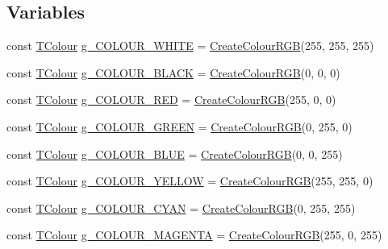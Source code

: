\subsection*{Variables}
\begin{DoxyCompactItemize}
\item 
const \hyperlink{struct_slim_1_1_t_colour}{T\+Colour} \hyperlink{namespace_slim_aabd7d1ab5686441d89da465b5d78e06c}{g\+\_\+\+C\+O\+L\+O\+U\+R\+\_\+\+W\+H\+I\+T\+E} = \hyperlink{namespace_slim_aa24ab919437d71782c999fbe3ae00684}{Create\+Colour\+R\+G\+B}(255, 255, 255)
\item 
const \hyperlink{struct_slim_1_1_t_colour}{T\+Colour} \hyperlink{namespace_slim_a8f55af55b9d6bd5d1a247ae77239e9ec}{g\+\_\+\+C\+O\+L\+O\+U\+R\+\_\+\+B\+L\+A\+C\+K} = \hyperlink{namespace_slim_aa24ab919437d71782c999fbe3ae00684}{Create\+Colour\+R\+G\+B}(0, 0, 0)
\item 
const \hyperlink{struct_slim_1_1_t_colour}{T\+Colour} \hyperlink{namespace_slim_a3ebe25e5235634ded92715ea38733109}{g\+\_\+\+C\+O\+L\+O\+U\+R\+\_\+\+R\+E\+D} = \hyperlink{namespace_slim_aa24ab919437d71782c999fbe3ae00684}{Create\+Colour\+R\+G\+B}(255, 0, 0)
\item 
const \hyperlink{struct_slim_1_1_t_colour}{T\+Colour} \hyperlink{namespace_slim_a9720f56180098de9f641858511f0a3f8}{g\+\_\+\+C\+O\+L\+O\+U\+R\+\_\+\+G\+R\+E\+E\+N} = \hyperlink{namespace_slim_aa24ab919437d71782c999fbe3ae00684}{Create\+Colour\+R\+G\+B}(0, 255, 0)
\item 
const \hyperlink{struct_slim_1_1_t_colour}{T\+Colour} \hyperlink{namespace_slim_a2ff65ee94b0f7dbb4cc7614b6d34b075}{g\+\_\+\+C\+O\+L\+O\+U\+R\+\_\+\+B\+L\+U\+E} = \hyperlink{namespace_slim_aa24ab919437d71782c999fbe3ae00684}{Create\+Colour\+R\+G\+B}(0, 0, 255)
\item 
const \hyperlink{struct_slim_1_1_t_colour}{T\+Colour} \hyperlink{namespace_slim_aff93ca871b54f6167a23aaaedf4eba95}{g\+\_\+\+C\+O\+L\+O\+U\+R\+\_\+\+Y\+E\+L\+L\+O\+W} = \hyperlink{namespace_slim_aa24ab919437d71782c999fbe3ae00684}{Create\+Colour\+R\+G\+B}(255, 255, 0)
\item 
const \hyperlink{struct_slim_1_1_t_colour}{T\+Colour} \hyperlink{namespace_slim_a3f18a21d67a8e4342f45d6dc38491e84}{g\+\_\+\+C\+O\+L\+O\+U\+R\+\_\+\+C\+Y\+A\+N} = \hyperlink{namespace_slim_aa24ab919437d71782c999fbe3ae00684}{Create\+Colour\+R\+G\+B}(0, 255, 255)
\item 
const \hyperlink{struct_slim_1_1_t_colour}{T\+Colour} \hyperlink{namespace_slim_a78adc5a20e7e82b76aa186b20213e74d}{g\+\_\+\+C\+O\+L\+O\+U\+R\+\_\+\+M\+A\+G\+E\+N\+T\+A} = \hyperlink{namespace_slim_aa24ab919437d71782c999fbe3ae00684}{Create\+Colour\+R\+G\+B}(255, 0, 255)

\end{DoxyCompactItemize}
